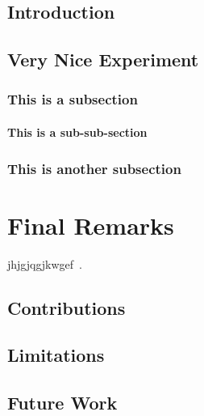 \documentclass[11pt, a4paper]{report}
\begin{document}
\section{Introduction}

\section{Very Nice Experiment}

\subsection{This is a subsection}

\subsubsection{This is a sub-sub-section}

\subsection{This is another subsection}


\chapter{Final Remarks}
jhjgjqgjkwgef~\cite{Lenth2011}.

\section{Contributions}

\section{Limitations}

\section{Future Work}




\end{document}
